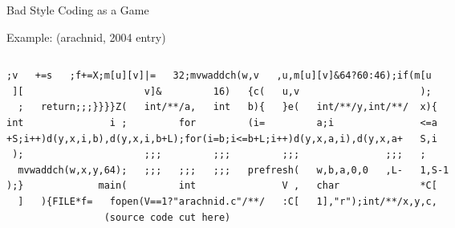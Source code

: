 \begin{frame}[fragile]{Bad Style Coding as a Game}
\begin{block}{Example: 
      {\normalsize (arachnid, 2004 entry)}}
\begin{columns}
\begin{column}{.6\linewidth}
{\begin{Verbatim}[fontsize=\tiny]
 ;v   +=s   ;f+=X;m[u][v]|=   32;mvwaddch(w,v   ,u,m[u][v]&64?60:46);if(m[u
 ][                     v]&         16)   {c(   u,v                     );
  ;   return;;;}}}}Z(   int/**/a,   int   b){   }e(   int/**/y,int/**/  x){
int               i ;         for         (i=         a;i               <=a
+S;i++)d(y,x,i,b),d(y,x,i,b+L);for(i=b;i<=b+L;i++)d(y,x,a,i),d(y,x,a+   S,i
 );                     ;;;         ;;;         ;;;               ;;;   ;
  mvwaddch(w,x,y,64);   ;;;   ;;;   ;;;   prefresh(   w,b,a,0,0   ,L-   1,S-1
);}             main(         int               V ,   char              *C[
  ]   ){FILE*f=   fopen(V==1?"arachnid.c"/**/   :C[   1],"r");int/**/x,y,c,
                 (source code cut here)
    \end{Verbatim}
  }%
      \end{column}
      \begin{column}{.4\linewidth}%
      \end{column}
    \end{columns}

  \end{block}
\end{frame}
